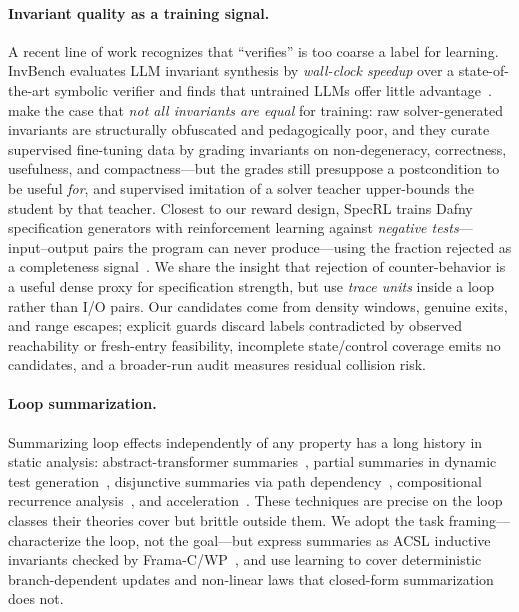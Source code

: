 \paragraph{Invariant quality as a training signal.}
A recent line of work recognizes that ``verifies'' is too coarse a label for learning.
InvBench evaluates LLM invariant synthesis by \emph{wall-clock speedup} over a state-of-the-art symbolic verifier and finds that untrained LLMs offer little advantage~\citep{wei2025invbench}.
\citet{pinto2026notall} make the case that \emph{not all invariants are equal} for training: raw solver-generated invariants are structurally obfuscated and pedagogically poor, and they curate supervised fine-tuning data by grading invariants on non-degeneracy, correctness, usefulness, and compactness---but the grades still presuppose a postcondition to be useful \emph{for}, and supervised imitation of a solver teacher upper-bounds the student by that teacher.
Closest to our reward design, SpecRL trains Dafny specification generators with reinforcement learning against \emph{negative tests}---input--output pairs the program can never produce---using the fraction rejected as a completeness signal~\citep{huang2026specrl}.
We share the insight that rejection of counter-behavior is a useful dense proxy for specification strength, but use \emph{trace units} inside a loop rather than I/O pairs.  Our candidates come from density windows, genuine exits, and range escapes; explicit guards discard labels contradicted by observed reachability or fresh-entry feasibility, incomplete state/control coverage emits no candidates, and a broader-run audit measures residual collision risk.

\paragraph{Loop summarization.}
Summarizing loop effects independently of any property has a long history in static analysis: abstract-transformer summaries~\citep{kroening2008loop}, partial summaries in dynamic test generation~\citep{godefroid2011automatic}, disjunctive summaries via path dependency~\citep{xie2016proteus}, compositional recurrence analysis~\citep{farzan2015compositional,kincaid2017compositional}, and acceleration~\citep{bardin2008fast}.
These techniques are precise on the loop classes their theories cover but brittle outside them.
We adopt the task framing---characterize the loop, not the goal---but express summaries as ACSL inductive invariants checked by Frama-C/WP~\citep{framac,acsl}, and use learning to cover deterministic branch-dependent updates and non-linear laws that closed-form summarization does not.

